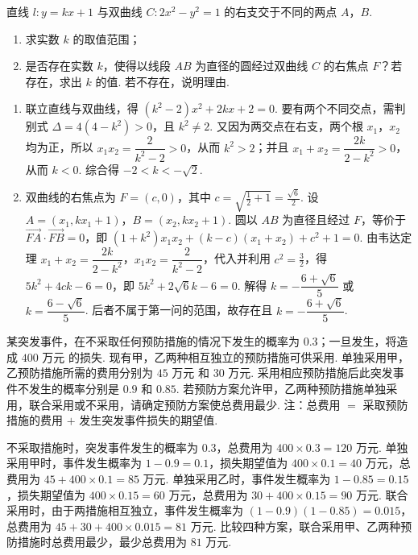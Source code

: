 \begin{problem}
直线 \(l: y = kx + 1\) 与双曲线 \(C: 2x^{2} - y^{2} = 1\) 的右支交于不同的两点 \(A\)，\(B\).

\begin{enumerate}
\item 求实数 \(k\) 的取值范围；
\item 是否存在实数 \(k\)，使得以线段 \(AB\) 为直径的圆经过双曲线 \(C\) 的右焦点 \(F\)？若存在，求出 \(k\) 的值. 若不存在，说明理由.
\end{enumerate}
\end{problem}

\begin{solution}
\begin{enumerate}
\item 联立直线与双曲线，得 \((k^2-2)x^2+2kx+2=0\). 要有两个不同交点，需判别式 \(\Delta=4(4-k^2)>0\)，且 \(k^2\ne2\). 又因为两交点在右支，两个根 \(x_1\)，\(x_2\) 均为正，所以 \(x_1x_2=\dfrac{2}{k^2-2}>0\)，从而 \(k^2>2\)；并且 \(x_1+x_2=\dfrac{2k}{2-k^2}>0\)，从而 \(k<0\). 综合得 \(-2<k<-\sqrt2\).
\item 双曲线的右焦点为 \(F=(c,0)\)，其中 \(c=\sqrt{\frac12+1}=\frac{\sqrt6}{2}\). 设 \(A=(x_1,kx_1+1)\)，\(B=(x_2,kx_2+1)\). 圆以 \(AB\) 为直径且经过 \(F\)，等价于 \(\overrightarrow{FA}\cdot\overrightarrow{FB}=0\)，即
\(\displaystyle(1+k^2)x_1x_2+(k-c)(x_1+x_2)+c^2+1=0\).
由韦达定理 \(x_1+x_2=\dfrac{2k}{2-k^2}\)，\(x_1x_2=\dfrac{2}{k^2-2}\)，代入并利用 \(c^2=\frac32\)，得 \(5k^2+4ck-6=0\)，即 \(5k^2+2\sqrt6 k-6=0\). 解得 \(k=-\dfrac{6+\sqrt6}{5}\) 或 \(k=\dfrac{6-\sqrt6}{5}\). 后者不属于第一问的范围，故存在且 \(k=-\dfrac{6+\sqrt6}{5}\).
\end{enumerate}
\end{solution}

\begin{problem}
某突发事件，在不采取任何预防措施的情况下发生的概率为 \(0.3\)；一旦发生，将造成 \(400\text{ 万元}\) 的损失. 现有甲，乙两种相互独立的预防措施可供采用. 单独采用甲，乙预防措施所需的费用分别为 \(45\text{ 万元}\) 和 \(30\text{ 万元}\). 采用相应预防措施后此突发事件不发生的概率分别是 \(0.9\) 和 \(0.85\). 若预防方案允许甲，乙两种预防措施单独采用，联合采用或不采用，请确定预防方案使总费用最少. 注：总费用 \(=\) 采取预防措施的费用 \(+\) 发生突发事件损失的期望值.
\end{problem}

\begin{solution}
不采取措施时，突发事件发生的概率为 \(0.3\)，总费用为 \(400\times0.3=120\text{ 万元}\). 单独采用甲时，事件发生概率为 \(1-0.9=0.1\)，损失期望值为 \(400\times0.1=40\text{ 万元}\)，总费用为 \(45+400\times0.1=85\text{ 万元}\). 单独采用乙时，事件发生概率为 \(1-0.85=0.15\)，损失期望值为 \(400\times0.15=60\text{ 万元}\)，总费用为 \(30+400\times0.15=90\text{ 万元}\). 联合采用时，由于两措施相互独立，事件发生概率为 \((1-0.9)(1-0.85)=0.015\)，总费用为 \(45+30+400\times0.015=81\text{ 万元}\). 比较四种方案，联合采用甲、乙两种预防措施时总费用最少，最少总费用为 \(81\text{ 万元}\).
\end{solution}

